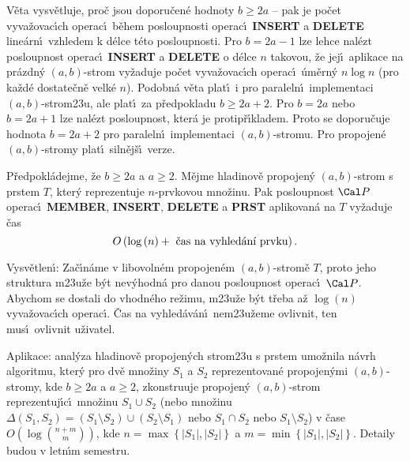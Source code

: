 \flushpar V\v eta vysv\v etluje, pro\v c jsou doporu\v cen\'e hodnoty $
b\ge 2a$ -- 
pak je po\v cet vyva\v zovac\'\i ch ope\-rac\'\i\ b\v ehem posloupnosti 
operac\'\i\ {\bf INSERT} a {\bf DELETE} line\'arn\'\i\ vzhledem k d\'elce 
t\'eto posloupnosti. Pro $b=2a-1$ lze lehce nal\'ezt 
posloupnost operac\'\i\ {\bf INSERT} a {\bf DELETE} o d\'elce $n$ takovou, 
\v ze jej\'\i\ aplikace na pr\'azdn\'y $\left(a,b\right)$-strom vy\v zaduje po\v cet 
vyva\v zovac\'\i ch operac\'\i\ \'u\-m\v ern\'y $n\log n$ (pro ka\v zd\'e 
dostate\v cn\v e velk\'e $n$). Podobn\'a v\v eta plat\'\i\ i pro paraleln\'\i\ 
implementaci $\left(a,b\right)$-strom\accent23u, ale plat\'\i\ za 
p\v redpokladu $b\ge 2a+2$. Pro $b=2a$ nebo $b=2a+1$ lze 
nal\'ezt posloupnost, kter\'a je protip\v r\'\i kladem. Proto se 
doporu\v cuje hodnota $b=2a+2$ pro paraleln\'\i\ implementaci 
$\left(a,b\right)$-stromu. Pro propojen\'e $\left(a,b\right)$-stromy plat\'\i\ siln\v ej\v s\'\i\ 
verze.

P\v redpokl\'adejme, \v ze $b\ge 2a$ a $a\ge 2$. M\v ejme 
hladinov\v e propojen\'y $\left(a,b\right)$-strom s prstem $T$, kter\'y reprezentuje 
$n$-prvkovou mno\v zinu. Pak posloupnost $\Cal P$ operac\'\i\ {\bf MEMBER},
{\bf INSERT}, {\bf DELETE} a {\bf PRST} aplikovan\'a na $T$ vy\v zaduje \v cas 
$$O\left(\log\left(n\right)+\text{\rm\ \v cas na vyhled\'an\'\i\ prvk\accent23u}\right)
.$$
\endproclaim


\flushpar Vysv\v etlen\'\i : Za\v c\'\i n\'ame v libovoln\'em 
propojen\'em $\left(a,b\right)$-stro\-m\v e $T$, proto jeho struktura 
m\accent23u\v ze b\'yt nev\'yhodn\'a pro danou pos\-loupnost operac\'\i\ $
\Cal P$. 
Abychom se dostali do vhodn\'eho re\v zimu, m\accent23u\v ze 
b\'yt t\v reba a\v z $\log\left(n\right)$ vyva\v zovac\'\i ch operac\'\i . \v Cas na 
vy\-hled\'av\'a\-n\'\i\ nem\accent23u\v zeme ovlivnit, ten mus\'\i\ 
ovlivnit u\v zivatel.
\medskip

\flushpar Aplikace: anal\'yza hladinov\v e propojen\'ych strom\accent23u s prstem 
u\-mo\v z\-nila n\'avrh algoritmu, kter\'y pro dv\v e mno\v ziny $
S_1$ a $S_2$ 
repre\-zentovan\'e propojen\'ymi $\left(a,b\right)$-stromy, kde $b\ge 2a$ a 
$a\ge 2$, 
zkonstruuje propojen\'y $\left(a,b\right)$-strom reprezentuj\'\i c\'\i\ mno\v zinu 
$S_1\cup S_2$ (nebo mno\v zinu $\Delta \left(S_1,S_2\right)=\left(S_1\setminus S_
2\right)\cup \left(S_2\setminus S_1\right)$ nebo 
$S_1\cap S_2$ nebo $S_1\setminus S_2$) v \v case $O\left(\log\binom {n
+m}m\right)$, kde 
$n=\max\left\{|S_1|,|S_2|\right\}$ a $m=\min\left\{|S_1|,|S_2|\right\}$. Detaily budou v letn\'\i m 
semestru.
\medskip

